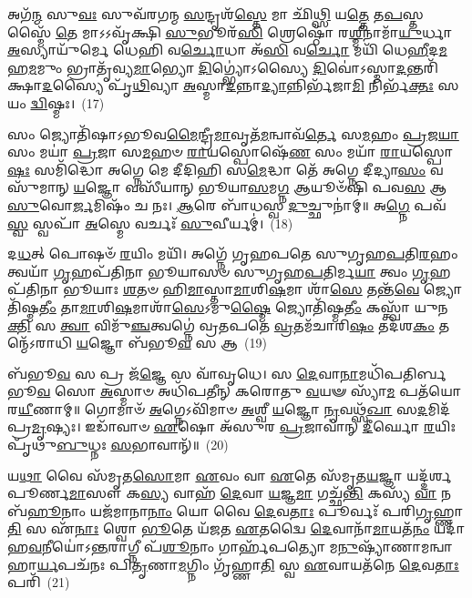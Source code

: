 {\anuvakamend[{𑌦𑌕𑍍𑌷𑌿᳴𑌣𑌾𑌯𑌾𑌂 \ul{𑌦𑍍𑌵𑌿}\-𑌷𑍍𑌮𑍋 𑌵𑌿\-\ul{𑌷𑍍𑌣𑍋}\-𑌰𑍇\-\ul{𑌕𑌾}\-𑌨𑍍𑌨\-\ul{𑌤𑍍𑌰𑌿}\-\-\ul{𑍞}\-𑌶𑌚𑍍𑌚᳴}]}%

𑌅𑌗᳴\-\ul{𑌨𑍍𑌮} 𑌸𑍁\-\ul{𑌵𑌃} 𑌸𑍁𑌵᳴𑌰𑌗𑌨𑍍𑌮 \ul{𑌸}\-𑌨𑍍𑌦𑍃𑌶᳴\-\ul{𑌸𑍍𑌤𑍇} 𑌮𑌾 𑌛𑌿᳴\-\ul{𑌥𑍍𑌸𑌿} 𑌯\-\ul{𑌤𑍍𑌤𑍇} 𑌤\-\ul{𑌪}\-𑌸𑍍𑌤𑌸𑍍𑌮𑍈᳴ \ul{𑌤𑍇} 𑌮𑌾\-𑌽\-𑌽𑌵𑍃᳴𑌕𑍍𑌷𑌿 \ul{𑌸𑍁}\-𑌭𑍂𑌰᳴\-\ul{𑌸𑌿} 𑌶𑍍𑌰𑍇𑌷𑍍𑌠𑍋᳴ 𑌰\-\ul{𑌶𑍍𑌮𑍀}\-𑌨𑌾𑌮𑌾᳴\-\ul{𑌯𑍁}\-𑌰𑍍𑌧𑌾 \ul{𑌅}\-𑌸𑍍𑌯𑌾𑌯𑍁᳴𑌰𑍍𑌮𑍇 𑌧𑍇𑌹𑌿 𑌵\-\ul{𑌰𑍍𑌚𑍋}\-𑌧𑌾 𑌅᳴\-\ul{𑌸𑌿} 𑌵\-\ul{𑌰𑍍𑌚𑍋} 𑌮𑌯𑌿᳴ 𑌧𑍇\-\ul{𑌹𑍀}\-𑌦\-\ul{𑌮}\-𑌹\-\ul{𑌮}\-𑌮𑍁𑌂 𑌭𑍍𑌰𑌾𑌤𑍃᳴𑌵𑍍𑌯\-\ul{𑌮𑌾}\-𑌭𑍍𑌯𑍋 \ul{𑌦𑌿}\-𑌗𑍍𑌭𑍍𑌯𑍋॑\-𑌽𑌸𑍍𑌯𑍈 \ul{𑌦𑌿}\-𑌵𑍋॑\-𑌽𑌸𑍍𑌮𑌾\-\ul{𑌦}\-𑌨𑍍𑌤𑌰𑌿᳴𑌕𑍍𑌷𑌾\-\ul{𑌦}\-𑌸𑍍𑌯𑍈 𑌪𑍃᳴\-\ul{𑌥𑌿}\-𑌵𑍍𑌯𑌾 \ul{𑌅}\-𑌸𑍍𑌮𑌾\-\ul{𑌦}\-𑌨𑍍𑌨𑌾\-\ul{𑌦𑍍𑌯𑌾}\-𑌨𑍍𑌨𑌿𑌰𑍍𑌭᳴𑌜𑌾\-\ul{𑌮𑌿} 𑌨𑌿𑌰𑍍𑌭᳴\-\ul{𑌕𑍍𑌤𑌃} 𑌸 𑌯𑌂 \ul{𑌦𑍍𑌵𑌿}\-𑌷𑍍𑌮𑌃।~(17)

𑌸𑌂 𑌜𑍍𑌯𑍋𑌤𑌿᳴𑌷𑌾\-𑌽𑌭𑍂𑌵\-\ul{𑌮𑍈}\-𑌨𑍍𑌦𑍍𑌰𑍀\-\ul{𑌮𑌾}\-𑌵𑍃𑌤᳴\-\ul{𑌮}\-𑌨𑍍𑌵𑌾𑌵᳴\-\ul{𑌰𑍍𑌤𑍇} 𑌸\-\ul{𑌮}\-𑌹𑌂 \ul{𑌪𑍍𑌰}\-𑌜\-\ul{𑌯𑌾} 𑌸𑌂 𑌮𑌯𑌾॑ \ul{𑌪𑍍𑌰}\-𑌜𑌾 𑌸\-\ul{𑌮}\-𑌹𑍞 \ul{𑌰𑌾}\-𑌯𑌸𑍍𑌪𑍋𑌷𑍇᳴\-\ul{𑌣} 𑌸𑌂 𑌮𑌯𑌾᳴ \ul{𑌰𑌾}\-𑌯𑌸𑍍𑌪𑍋\-\ul{𑌷𑌃} 𑌸𑌮𑌿᳴𑌦𑍍𑌧𑍋 𑌅𑌗𑍍𑌨𑍇 𑌮𑍇 𑌦𑍀𑌦𑌿𑌹𑌿 𑌸\-\ul{𑌮𑍇}\-𑌦𑍍𑌧𑌾 𑌤𑍇᳴ 𑌅𑌗𑍍𑌨𑍇 𑌦𑍀𑌦𑍍𑌯𑌾\-\ul{𑌸𑌂} 𑌵𑌸𑍁᳴𑌮𑌾𑌨𑍍 \ul{𑌯}\-𑌜𑍍𑌞𑍋 𑌵𑌸𑍀᳴𑌯𑌾𑌨𑍍 𑌭𑍂𑌯𑌾\-\ul{𑌸}\-𑌮\-\ul{𑌗𑍍𑌨} 𑌆𑌯𑍂𑍞᳴𑌷𑌿 𑌪𑌵\-\ul{𑌸} 𑌆 \ul{𑌸𑍁}\-𑌵𑍋\-\ul{𑌰𑍍𑌜}\-𑌮𑌿𑌷𑌂᳴ 𑌚 𑌨𑌃। \ul{𑌆}\-𑌰𑍇 𑌬𑌾᳴𑌧𑌸𑍍𑌵 \ul{𑌦𑍁}\-𑌚𑍍𑌛𑍁𑌨𑌾॑𑌮𑍍॥ 𑌅\-\ul{𑌗𑍍𑌨𑍇} 𑌪𑌵᳴\-\ul{𑌸𑍍𑌵} 𑌸𑍍𑌵𑌪𑌾᳴ \ul{𑌅}\-𑌸𑍍𑌮𑍇 𑌵𑌰𑍍𑌚𑌃᳴ \ul{𑌸𑍁}\-𑌵𑍀𑌰𑍍𑌯𑌮𑍍॑।~(18)

𑌦\-\ul{𑌧}\-𑌤𑍍 𑌪𑍋𑌷𑍞᳴ \ul{𑌰}\-𑌯𑌿𑌂 𑌮𑌯𑌿᳴। 𑌅𑌗𑍍𑌨𑍇᳴ 𑌗𑍃𑌹𑌪𑌤𑍇 𑌸𑍁𑌗𑍃𑌹\-\ul{𑌪}\-𑌤𑌿\-\ul{𑌰}\-𑌹𑌂 𑌤𑍍𑌵𑌯𑌾᳴ \ul{𑌗𑍃}\-𑌹𑌪᳴𑌤𑌿𑌨𑌾 𑌭𑍂𑌯𑌾𑌸𑍞 𑌸𑍁𑌗𑍃𑌹\-\ul{𑌪}\-𑌤𑌿𑌰𑍍𑌮\-\ul{𑌯𑌾} 𑌤𑍍𑌵𑌂 \ul{𑌗𑍃}\-𑌹𑌪᳴𑌤𑌿𑌨𑌾 𑌭𑍂𑌯𑌾𑌃 \ul{𑌶}\-𑌤𑍞 𑌹𑌿\-\ul{𑌮𑌾}\-𑌸𑍍𑌤𑌾\-\ul{𑌮𑌾}\-𑌶𑌿\-\ul{𑌷}\-𑌮𑌾 𑌶𑌾᳴\-\ul{𑌸𑍇} 𑌤𑌨𑍍𑌤᳴\-\ul{𑌵𑍇} 𑌜𑍍𑌯𑍋𑌤𑌿᳴𑌷𑍍𑌮\-\ul{𑌤𑍀𑌂} 𑌤𑌾\-\ul{𑌮𑌾}\-𑌶𑌿\-\ul{𑌷}\-𑌮𑌾𑌶𑌾᳴\-\ul{𑌸𑍇}\-\-𑌽𑌮𑍁\-\ul{𑌷𑍍𑌮𑍈} 𑌜𑍍𑌯𑍋𑌤𑌿᳴𑌷𑍍𑌮\-\ul{𑌤𑍀𑌂} 𑌕𑌸𑍍𑌤𑍍𑌵𑌾᳴ 𑌯𑍁𑌨\-\ul{𑌕𑍍𑌤𑌿} 𑌸 \ul{𑌤𑍍𑌵𑌾} 𑌵𑌿𑌮𑍁᳴\-\ul{𑌞𑍍𑌚}\-𑌤𑍍𑌵𑌗𑍍𑌨𑍇॑ 𑌵𑍍𑌰𑌤𑌪𑌤𑍇 \ul{𑌵𑍍𑌰}\-𑌤𑌮᳴𑌚𑌾𑌰𑌿\-\ul{𑌷𑌂} 𑌤𑌦᳴𑌶\-\ul{𑌕𑌂} 𑌤𑌨𑍍𑌮𑍇᳴\-𑌽𑌰𑌾𑌧𑌿 \ul{𑌯}\-𑌜𑍍𑌞𑍋 𑌬᳴𑌭𑍂\-\ul{𑌵} 𑌸 𑌆~(19)

𑌬᳴𑌭𑍂\-\ul{𑌵} 𑌸 𑌪𑍍𑌰 𑌜᳴\-\ul{𑌜𑍍𑌞𑍇} 𑌸 𑌵𑌾᳴𑌵𑍃𑌧𑍇। 𑌸 \ul{𑌦𑍇}\-𑌵𑌾\-\ul{𑌨𑌾}\-𑌮𑌧𑌿᳴𑌪𑌤𑌿𑌰𑍍𑌬𑌭𑍂\-\ul{𑌵} 𑌸𑍋 \ul{𑌅}\-𑌸𑍍𑌮𑌾𑍞 𑌅𑌧𑌿᳴𑌪𑌤𑍀𑌨𑍍 𑌕𑌰𑍋𑌤𑍁 \ul{𑌵}\-𑌯𑍟 𑌸𑍍𑌯𑌾᳴\-\ul{𑌮} 𑌪𑌤᳴𑌯𑍋 𑌰\-\ul{𑌯𑍀}\-𑌣𑌾𑌮𑍍॥ 𑌗𑍋𑌮𑌾𑍞᳴ \ul{𑌅}\-𑌗𑍍𑌨𑍇\-𑌽𑌵𑌿᳴𑌮𑌾𑍞 \ul{𑌅}\-𑌶𑍍𑌵𑍀 \ul{𑌯}\-𑌜𑍍𑌞𑍋 \ul{𑌨𑍃}\-𑌵𑌥𑍍𑌸᳴\-\ul{𑌖𑌾} 𑌸\-\ul{𑌦}\-𑌮𑌿𑌦᳴𑌪𑍍𑌰\-\ul{𑌮𑍃}\-𑌷𑍍𑌯𑌃। 𑌇𑌡𑌾᳴𑌵𑌾𑍞 \ul{𑌏}\-𑌷𑍋 𑌅᳴𑌸𑍁𑌰 \ul{𑌪𑍍𑌰}\-𑌜𑌾𑌵𑌾॑𑌨𑍍 \ul{𑌦𑍀}\-𑌰𑍍𑌘𑍋 \ul{𑌰}\-𑌯𑌿𑌃 𑌪𑍃᳴𑌥𑍁\-\ul{𑌬𑍁}\-𑌧𑍍𑌨𑌃 \ul{𑌸}\-𑌭𑌾𑌵𑌾𑌨𑍍᳴॥~(20)

{\anuvakamend[{\-\ul{𑌦𑍍𑌵𑌿}\-𑌷𑍍𑌮𑌃 \ul{𑌸𑍁}\-𑌵𑍀\-\ul{𑌰𑍍𑌯}\-\-\ul{𑍞} 𑌸 𑌆 𑌪𑌞𑍍𑌚᳴𑌤𑍍𑌰𑌿𑍞𑌶𑌚𑍍𑌚}]}%

𑌯\-\ul{𑌥𑌾} 𑌵𑍈 𑌸᳴𑌮𑍃𑌤\-\ul{𑌸𑍋}\-𑌮𑌾 \ul{𑌏}\-𑌵𑌂 𑌵𑌾 \ul{𑌏}\-𑌤𑍇 𑌸᳴𑌮𑍃𑌤\-\ul{𑌯}\-𑌜𑍍𑌞𑌾 𑌯𑌦𑍍𑌦᳴𑌰𑍍\mbox{}𑌶𑌪𑍂𑌰𑍍𑌣\-\ul{𑌮𑌾}\-𑌸𑍗 𑌕\-\ul{𑌸𑍍𑌯} 𑌵𑌾𑌹᳴ \ul{𑌦𑍇}\-𑌵𑌾 \ul{𑌯}\-𑌜𑍍𑌞\-\ul{𑌮𑌾} 𑌗𑌚𑍍𑌛᳴\-\ul{𑌨𑍍𑌤𑌿} 𑌕𑌸𑍍𑌯᳴ \ul{𑌵𑌾} 𑌨 𑌬᳴\-\ul{𑌹𑍂}\-𑌨𑌾𑌂 𑌯𑌜᳴𑌮𑌾𑌨𑌾\-\ul{𑌨𑌾𑌂} 𑌯𑍋 𑌵𑍈 \ul{𑌦𑍇}\-𑌵\-\ul{𑌤𑌾𑌃} 𑌪𑍂𑌰𑍍𑌵𑌃᳴ 𑌪𑌰𑌿\-\ul{𑌗𑍃}\-𑌹𑍍𑌣𑌾\-\ul{𑌤𑌿} 𑌸 𑌏᳴\-\ul{𑌨𑌾𑌃} 𑌶𑍍𑌵𑍋 \ul{𑌭𑍂}\-𑌤𑍇 𑌯᳴𑌜𑌤 \ul{𑌏}\-𑌤𑌦𑍍𑌵𑍈 \ul{𑌦𑍇}\-𑌵𑌾𑌨𑌾᳴\-\ul{𑌮𑌾}\-𑌯𑌤᳴\-\ul{𑌨𑌂} 𑌯𑌦𑌾᳴𑌹\-\ul{𑌵}\-𑌨𑍀𑌯𑍋॑\-𑌽\-\ul{𑌨𑍍𑌤}\-𑌰𑌾𑌗𑍍𑌨𑍀 𑌪᳴\-\ul{𑌶𑍂}\-𑌨𑌾𑌂 𑌗𑌾𑌰𑍍\mbox{}𑌹᳴𑌪𑌤𑍍𑌯𑍋 𑌮\-\ul{𑌨𑍁}\-𑌷𑍍𑌯𑌾᳴𑌣𑌾𑌮𑌨𑍍𑌵𑌾𑌹𑌾\-\ul{𑌰𑍍𑌯}\-𑌪𑌚᳴𑌨𑌃 𑌪𑌿\-\ul{𑌤𑍃}\-𑌣𑌾\-\ul{𑌮}\-𑌗𑍍𑌨𑌿𑌂 𑌗𑍃᳴𑌹𑍍𑌣𑌾\-\ul{𑌤𑌿} 𑌸𑍍𑌵 \ul{𑌏}\-𑌵𑌾𑌯𑌤᳴𑌨𑍇 \ul{𑌦𑍇}\-𑌵\-\ul{𑌤𑌾𑌃} 𑌪𑌰𑌿᳴~(21)

